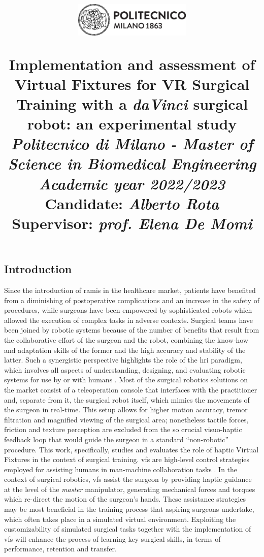 \documentclass{article}
\title{
\begin{figure}[h!]
\centering
\includegraphics[width=0.5\textwidth]{images/logo_polimi_scritta2.eps}
\end{figure}
\textbf{Implementation and assessment of Virtual Fixtures for VR Surgical Training with a \textit{daVinci} surgical robot: an experimental study}
\\
\vspace{0.5cm}\large{\textit{Politecnico di Milano - Master of Science in Biomedical Engineering}}
\\
\vspace{0.5cm}\textit{\small{Academic year 2022/2023}}\vspace{0.5cm}\\
{\large \textbf{Candidate: \textit{Alberto Rota}}\\
\textbf{Supervisor: \textit{prof. Elena De Momi}}}}
\author{}
\date{}
\begin{document}
\maketitle

\begin{multicols}{2}


\section{Introduction}
Since the introduction of \ac{ramis} in the healthcare market, patients have benefited from a diminishing of postoperative complications and an increase in the safety of procedures, while surgeons have been empowered by sophisticated robots which allowed the execution of complex tasks in adverse contexts. 
\newline
Surgical teams have been joined by robotic systems because of the number of benefits that result from the collaborative effort of the surgeon and the robot, combining the know-how and adaptation skills of the former and the high accuracy and stability of the latter. Such a synergistic perspective highlights the role of the \ac{hri} paradigm, which involves all aspects of understanding, designing, and evaluating robotic systems for use by or with humans \cite{Goodrich2007}. Most of the surgical robotics solutions on the market consist of a teleoperation console that interfaces with the practitioner and, separate from it, the surgical robot itself, which mimics the movements of the surgeon in real-time. This setup allows for higher motion accuracy, tremor filtration and magnified viewing of the surgical area; nonetheless tactile forces, friction and texture perception are excluded from the so crucial visuo-haptic feedback loop that would guide the surgeon in a standard ``non-robotic'' procedure.
\newline
This work, specifically, studies and evaluates the role of haptic Virtual Fixtures in the context of surgical training. \acp{vf} are high-level control strategies employed for assisting humans in man-machine collaboration tasks \cite{Bowyer2014}. In the context of surgical robotics, \acp{vf} assist the surgeon by providing haptic guidance at the level of the \textit{master} manipulator, generating mechanical forces and torques which re-direct the motion of the surgeon's hands. These assistance strategies may be most beneficial in the training process that aspiring surgeons undertake, which often takes place in a simulated virtual environment. Exploiting the customizability of simulated surgical tasks together with the implementation of \acp{vf} will enhance the process of learning key surgical skills, in terms of performance, retention and transfer.

\end{multicols}
\end{document}
